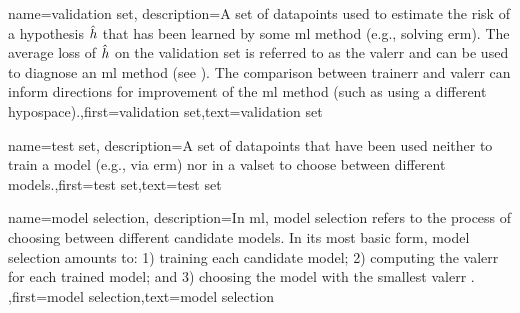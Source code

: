 {name={validation set},
  description={A set of \gls{datapoint}s used to estimate 
  	the \gls{risk} of a \gls{hypothesis} $\hat{h}$ that has been learned by some 
  	\gls{ml} method (e.g., solving \gls{erm}). The average \gls{loss} of $\hat{h}$ 
  	on the \gls{validation} set is referred to as the \gls{valerr} and can be used to diagnose an 
  	\gls{ml} method (see \cite[Sec. 6.6]{MLBasics}). The comparison between \gls{trainerr} 
  	and \gls{valerr} can inform directions for improvement of the \gls{ml} method (such as 
  	using a different \gls{hypospace}).},first={validation set},text={validation set}  
}

{name={test set},
	description={A set of \gls{datapoint}s that have  
		been used neither to train a \gls{model} (e.g., via \gls{erm}) nor in a \gls{valset} 
		to choose between different \gls{model}s.},first={test set},text={test set}  
}


{name={model selection},
	description={In \gls{ml}, \gls{model} selection refers to the 
		process of choosing between different candidate \gls{model}s. In its most 
		basic form, \gls{model} selection amounts to: 1) training each candidate \gls{model}; 
		2) computing the \gls{valerr} for each trained \gls{model}; and 3) choosing the \gls{model} 
		with the smallest \gls{valerr} \cite[Ch. 6]{MLBasics}. },first={model selection},text={model selection}  
}







